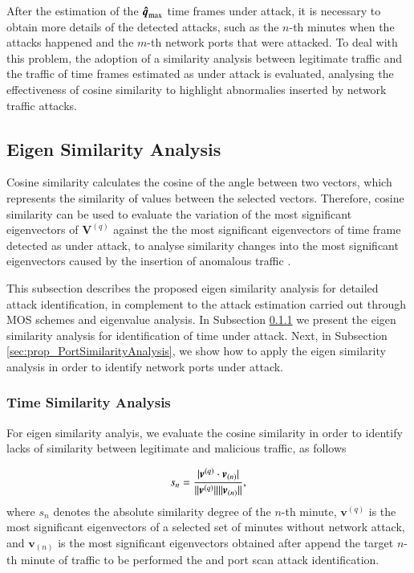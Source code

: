 \documentclass[review]{elsarticle}
\DeclarePairedDelimiter\abs{\lvert}{\rvert}%
\DeclarePairedDelimiter\norm{\lVert}{\rVert}%
\providecommand{\DIFaddtex}[1]{{\protect\color{blue}\uwave{#1}}} %
\providecommand{\DIFaddbegin}{} %
\providecommand{\DIFaddend}{} %
\providecommand{\DIFadd}[1]{\texorpdfstring{\DIFaddtex{#1}}{#1}} %
\begin{document}
After the estimation of the $\rm{\boldsymbol{\hat{q}}}_{\rm max}$ time frames under attack, it is necessary to obtain more details of the detected attacks, such as the $n$-th minutes when the attacks happened and the $m$-th network ports that were attacked. To deal with this problem, the adoption of a similarity analysis between legitimate traffic and the traffic of time frames estimated as under attack is evaluated, analysing the effectiveness of cosine similarity to highlight abnormalies inserted by network traffic attacks. 

\subsection{Eigen Similarity Analysis}
\label{sec:prop_EigenSimilarityAnalysis}

Cosine similarity calculates the cosine of the angle between two vectors, which represents the similarity of values between the selected vectors. Therefore, cosine similarity can be used to evaluate the variation of the most significant eigenvectors of $\boldsymbol{V}^{(q)}$ against the the most significant eigenvectors of time frame detected as under attack, to analyse similarity changes into the most significant eigenvectors caused by the insertion of anomalous traffic \cite{Lee2013}. 

This subsection describes the proposed eigen similarity analysis for detailed attack identification, in complement to the attack estimation carried out through MOS schemes and eigenvalue analysis. In Subsection \ref{sec:prop_TimeSimilarityAnalysis} we present the eigen similarity analysis for identification of time under attack. Next, in Subsection \ref{sec:prop_PortSimilarityAnalysis}, we show how to apply the eigen similarity analysis in order to identify network ports under attack.

\subsubsection{Time Similarity Analysis}
\label{sec:prop_TimeSimilarityAnalysis}

For eigen similarity analyis, we evaluate the cosine similarity in order to identify lacks of similarity between legitimate and malicious traffic, as follows

\begin{equation}\label{eq:eq11}
s_n = \frac{\abs{\boldsymbol{v}^{(q)} \cdot \boldsymbol{v}_{(n)}}}{\norm{\boldsymbol{v}^{(q)}}\norm{\boldsymbol{v}_{(n)}}},
\end{equation}
where $s_n$ denotes the absolute similarity degree of the $n$-th minute, $\boldsymbol{v}^{(q)}$ is the most significant eigenvectors of a selected set of minutes without network attack, and $\boldsymbol{v}_{(n)}$ is the most significant eigenvectors obtained after append the target $n$-th minute of traffic to be performed the \DIFaddbegin \DIFadd{flood }\DIFaddend and port scan attack identification.
\end{document}
